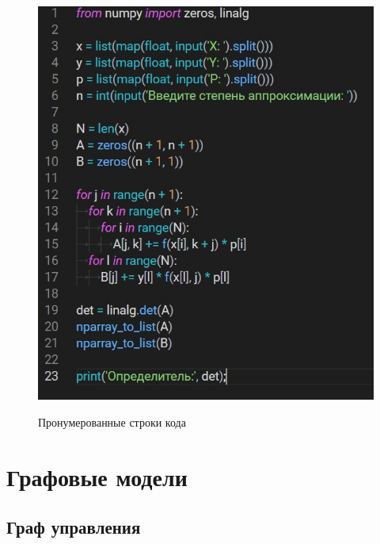 \documentclass[12pt]{report}
\begin{document}
\begin{figure}[H]
	\centering	
	{\includegraphics[scale=0.6]{code.png}}
	\caption{Пронумерованные строки кода}
	\label{ris:image_code}
\end{figure}

\chapter{Графовые модели}
\section{Граф управления}
	
\end{document}
